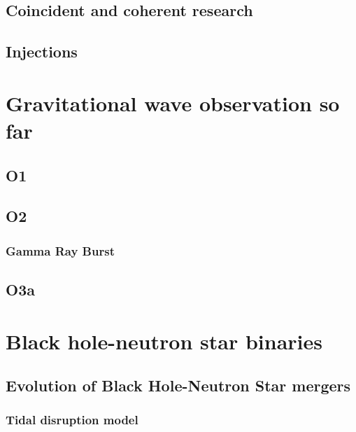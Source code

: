 \documentclass[binding=0.6cm, LaM]{sapthesis}
\begin{document}
\section{Coincident and coherent research}

\section{Injections}


\chapter{Gravitational wave observation so far}

\section{O1}

\section{O2}

\subsection{Gamma Ray Burst}

\section{O3a}
\chapter{Black hole-neutron star binaries}



\section{Evolution of Black Hole-Neutron Star mergers}



\subsection{Tidal disruption model}
\end{document}
